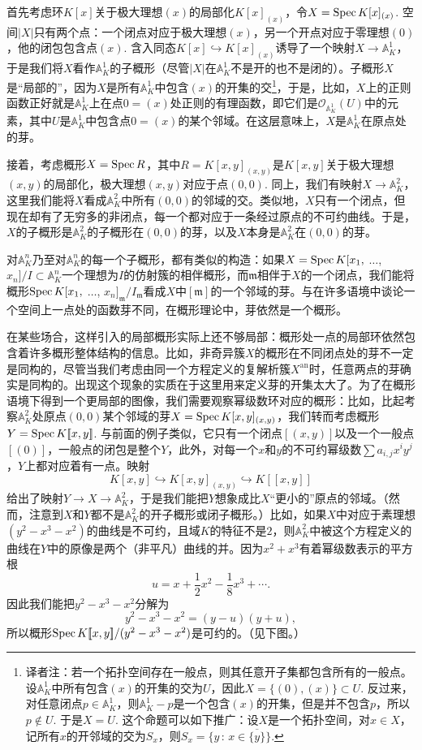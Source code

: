 首先考虑环$K[x]$关于极大理想$(x)$的局部化$K[x]_{(x)}$，令$X=\operatorname{Spec} K[x]_{(x)}$. 空间$|X|$只有两个点：一个闭点对应于极大理想$(x)$，另一个开点对应于零理想$(0)$，他的闭包包含点$(x)$. 含入同态$K[x]\hookrightarrow K[x]_{(x)}$诱导了一个映射$X\to \mathbb{A}_K^1$，于是我们将$X$看作$\mathbb{A}_K^1$的子概形（尽管$|X|$在$\mathbb{A}_K^1$不是开的也不是闭的）。子概形$X$是“局部的”，因为$X$是所有$\mathbb{A}_K^1$中包含$(x)$的开集的交\footnote{译者注：若一个拓扑空间存在一般点，则其任意开子集都包含所有的一般点。设$\mathbb{A}_K^1$中所有包含$(x)$的开集的交为$U$，因此$X=\{(0),(x)\}\subset U$. 反过来，对任意闭点$p\in \mathbb{A}_K^1$，则$\mathbb{A}_K^1-p$是一个包含$(x)$的开集，但是并不包含$p$，所以$p\not\in U$. 于是$X=U$. 这个命题可以如下推广：设$X$是一个拓扑空间，对$x\in X$，记所有$x$的开邻域的交为$S_x$，则$S_x=\{y\,:\, x\in \overline{\{y\}}\}$.}，于是，比如，$X$上的正则函数正好就是$\mathbb{A}_K^1$上在点$0=(x)$处正则的有理函数，即它们是$\mathscr{O}_{\mathbb{A}_K^1}(U)$中的元素，其中$U$是$\mathbb{A}_K^1$中包含点$0=(x)$的某个邻域。在这层意味上，$X$是$\mathbb{A}_K^1$在原点处的芽。

接着，考虑概形$X=\operatorname{Spec} R$，其中$R=K[x,y]_{(x,y)}$是$K[x,y]$关于极大理想$(x,y)$的局部化，极大理想$(x,y)$对应于点$(0,0)$. 同上，我们有映射$X\to \mathbb{A}_K^2$，这里我们能将$X$看成$\mathbb{A}_K^2$中所有$(0,0)$的邻域的交。类似地，$X$只有一个闭点，但现在却有了无穷多的非闭点，每一个都对应于一条经过原点的不可约曲线。于是，$X$的子概形是$\mathbb{A}_K^2$的子概形在$(0,0)$的芽，以及$X$本身是$\mathbb{A}_K^2$在$(0,0)$的芽。

对$\mathbb{A}_K^n$乃至对$\mathbb{A}_K^n$的每一个子概形，都有类似的构造：如果$X=\operatorname{Spec} K[x_1,$ $\dots$, $x_n]/I\subset \mathbb{A}_K^n$一个理想为$I$的仿射簇的相伴概形，而$\mathfrak{m}$相伴于$X$的一个闭点，我们能将概形$\operatorname{Spec} K[x_1,$ $\dots$, $x_n]_\mathfrak{m}/I_{\mathfrak{m}}$看成$X$中$[\mathfrak{m}]$的一个邻域的芽。与在许多语境中谈论一个空间上一点处的函数芽不同，在概形理论中，芽依然是一个概形。

在某些场合，这样引入的局部概形实际上还不够局部：概形处一点的局部环依然包含着许多概形整体结构的信息。比如，非奇异簇$X$的概形在不同闭点处的芽不一定是同构的，尽管当我们考虑由同一个方程定义的复解析簇$X^{\text{an}}$时，任意两点的芽确实是同构的。出现这个现象的实质在于这里用来定义芽的开集太大了。为了在概形语境下得到一个更局部的图像，我们需要观察幂级数环对应的概形：比如，比起考察$\mathbb{A}_K^2$处原点$(0,0)$某个邻域的芽$X=\operatorname{Spec} K[x,y]_{(x,y)}$，我们转而考虑概形$Y=\operatorname{Spec} K [\![x,y]\!]$. 与前面的例子类似，它只有一个闭点$[(x,y)]$以及一个一般点$[(0)]$，一般点的闭包是整个$Y$，此外，对每一个$x$和$y$的不可约幂级数$\sum a_{i,j}x^iy^j$，$Y$上都对应着有一点。映射
\[
	K[x,y]\hookrightarrow K[x,y]_{(x,y)}\hookrightarrow K[\![x,y]\!]
\]
给出了映射$Y\to X\to \mathbb{A}_K^2$，于是我们能把$Y$想象成比$X$“更小的”原点的邻域。（然而，注意到$X$和$Y$都不是$\mathbb{A}_K^2$的开子概形或闭子概形。）比如，如果$X$中对应于素理想$(y^2-x^3-x^2)$的曲线是不可约，且域$K$的特征不是$2$，则$\mathbb{A}_K^2$中被这个方程定义的曲线在$Y$中的原像是两个（非平凡）曲线的并。因为$x^2+x^3$有着幂级数表示的平方根
\[
	u=x+\frac{1}{2}x^2-\frac{1}{8}x^3+\cdots.
\]
因此我们能把$y^2-x^3-x^2$分解为
\[
	y^2-x^3-x^2=(y-u)(y+u),
\]
所以概形$\operatorname{Spec}  K[\![x,y]\!]/(y^2-x^3-x^2)$是可约的。（见下图。）

